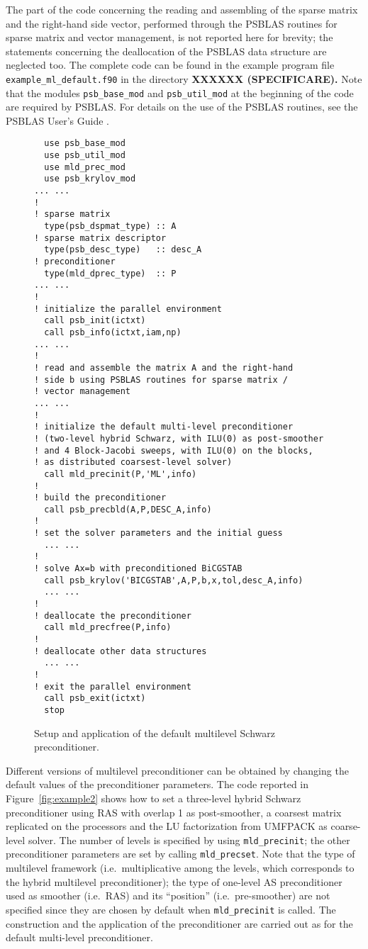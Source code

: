 The part of the code concerning the
reading and assembling of the sparse matrix and the right-hand side vector, performed
through the PSBLAS routines for sparse matrix and vector management, is not reported
here for brevity; the statements concerning the deallocation of the PSBLAS data structure
are neglected too.
The complete code can be found in the example program file \verb|example_ml_default.f90|
in the directory \textbf{XXXXXX (SPECIFICARE).} Note that the modules \verb|psb_base_mod|
and \verb|psb_util_mod| at the beginning of the code are required by PSBLAS.
For details on the use of the PSBLAS routines, see the PSBLAS User's Guide \cite{}.

\begin{figure}[tbp]
\begin{center}
{\small
\begin{verbatim}
  use psb_base_mod
  use psb_util_mod 
  use mld_prec_mod
  use psb_krylov_mod
... ...
!
! sparse matrix
  type(psb_dspmat_type) :: A
! sparse matrix descriptor
  type(psb_desc_type)   :: desc_A
! preconditioner
  type(mld_dprec_type)  :: P
... ...
!
! initialize the parallel environment
  call psb_init(ictxt)
  call psb_info(ictxt,iam,np)
... ...
!
! read and assemble the matrix A and the right-hand
! side b using PSBLAS routines for sparse matrix /
! vector management
... ...
!
! initialize the default multi-level preconditioner
! (two-level hybrid Schwarz, with ILU(0) as post-smoother
! and 4 Block-Jacobi sweeps, with ILU(0) on the blocks,
! as distributed coarsest-level solver)
  call mld_precinit(P,'ML',info)
!
! build the preconditioner
  call psb_precbld(A,P,DESC_A,info)
!
! set the solver parameters and the initial guess
  ... ...
!
! solve Ax=b with preconditioned BiCGSTAB
  call psb_krylov('BICGSTAB',A,P,b,x,tol,desc_A,info)
  ... ...
!
! deallocate the preconditioner
  call mld_precfree(P,info)
!
! deallocate other data structures
  ... ...
!
! exit the parallel environment
  call psb_exit(ictxt)
  stop
\end{verbatim}
}
\caption{Setup and application of the default multilevel Schwarz preconditioner.
\label{fig:example1}}
\end{center}
\end{figure}

Different versions of multilevel preconditioner can be obtained by changing
the default values of the preconditioner parameters. The code reported in
Figure~\ref{fig:example2} shows how to set a three-level hybrid Schwarz preconditioner
using RAS with overlap 1 as post-smoother, a coarsest matrix replicated
on the processors and the LU factorization from UMFPACK as coarse-level solver.
The number of levels is specified by using \verb|mld_precinit|; the other
preconditioner parameters are set by calling \verb|mld_precset|. Note that
the type of multilevel framework (i.e.\ multiplicative among the levels,
which corresponds to the hybrid multilevel preconditioner); the type
of one-level AS preconditioner used as smoother (i.e.\ RAS)
and its ``position'' (i.e.\ pre-smoother) are not specified since they
are chosen by default when \verb|mld_precinit| is called.
The construction and the application of the preconditioner
are carried out as for the default multi-level preconditioner.


